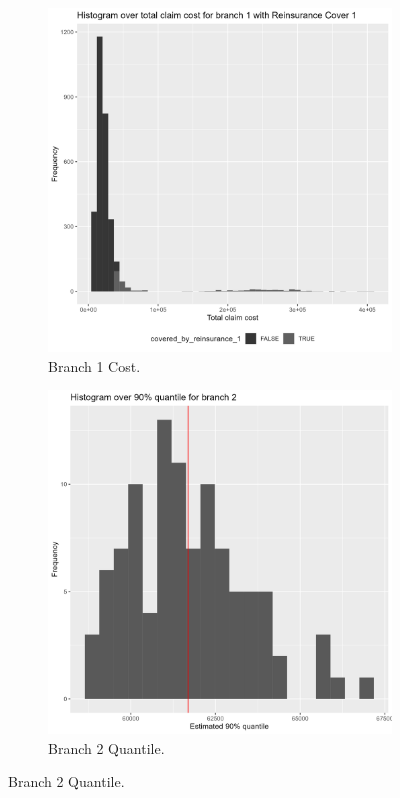 \documentclass[11pt]{article}
\begin{document}
\begin{figure}[!h]
\begin{subfigure}{.24\textwidth}
      \includegraphics[width=.9\linewidth]{plots/reinsurance1/histogram_total_claim_cost_reinsurance1.png}
      \caption{Branch 1 Cost.}
    \end{subfigure}
    \begin{subfigure}{.24\textwidth}
      \centering
      \includegraphics[width=.9\linewidth]{plots/reinsurance1/histogram_over_90p_quantile_2.png}
      \caption{Branch 2 Quantile.}

\end{subfigure}
\end{figure}
\end{document}
